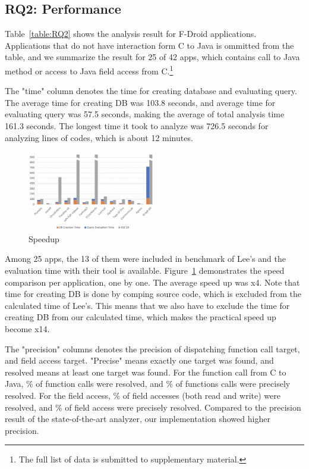 \subsection{RQ2: Performance}


Table~\ref{table:RQ2} shows the analysis result for F-Droid applications.
Applications that do not have interaction form C to Java is ommitted from the
table, and we summarize the result for 25 of 42 apps, which contains call to
Java method or access to Java field access from C.\footnote{The full list of data
is submitted to supplementary material.}

The "time" column denotes the time for creating database and evaluating query.
The average time for creating DB was 103.8 seconds, and average time for
evaluating query was 57.5 seconds, making the average of total analysis time
161.3 seconds. The longest time it took to analyze was 726.5 seconds for
analyzing  lines of codes, which is about 12 minutes.

\begin{figure}[t]
  \centering
  \vspace{2mm}
  \includegraphics[width=0.5\textwidth]{img/graph}
  \vspace*{-1.5em}
  \caption{Speedup}
  \label{fig:graph}
\vspace*{-.5em}
\end{figure}

Among 25 apps, the 13 of them were included in benchmark of Lee's and the
evaluation time with their tool is available.  Figure~\ref{fig:graph}
demonstrates the speed comparison per application, one by one.  The average
speed up was x4. Note that time for creating DB is done by comping source code,
which is excluded from the calculated time of Lee's. This means that we also
have to exclude the time for creating DB from our calculated time, which makes
the practical speed up become x14.

The "precision" columns denotes the precision of dispatching function call
target, and field access target.  "Precise" means exactly one target was found,
and resolved means at least one target was found. For the function call from C to Java,
\% of function calls were resolved, and \% of functions calls
were precisely resolved. For the field access, \% of field accesses (both
read and write) were resolved, and \% of field access were precisely resolved.
Compared to the precision result of the state-of-the-art analyzer, our implementation
showed higher precision.

